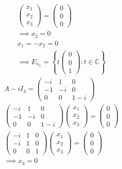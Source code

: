 \begin{enumerate}
\begin{gather}
\begin{pmatrix}
x_1\\x_2\\x_3
\end{pmatrix}
=
\begin{pmatrix}
0\\0\\0
\end{pmatrix}\\
\implies x_2 = 0\\
x_1 = -x_2 = 0\\
\implies E_{\lambda_1} = \left\{
t\begin{pmatrix}0\\0\\1\end{pmatrix} \colon t \in \mathbb{C} 
\right\}
\end{gather}
\begin{gather}
A - i I_3 =\begin{pmatrix}
-i & 1 & 0\\
-1 & -i & 0\\
0 & 0 & 1-i
\end{pmatrix}\\
\begin{pmatrix}
-i & 1 & 0\\
-1 & -i & 0\\
0 & 0 & 1-i
\end{pmatrix}
\begin{pmatrix}
x_1\\x_2\\x_3
\end{pmatrix}
=
\begin{pmatrix}
0\\0\\0
\end{pmatrix}\\
\begin{pmatrix}
-i & 1 & 0\\
-i & 1 & 0\\
0 & 0 & 1
\end{pmatrix}
\begin{pmatrix}
x_1\\x_2\\x_3
\end{pmatrix}
=
\begin{pmatrix}
0\\0\\0
\end{pmatrix}\\
\implies x_3 = 0\\

\end{gather}
\end{enumerate}
